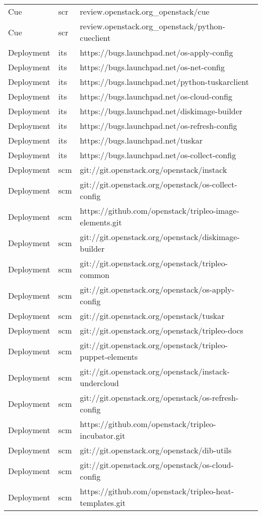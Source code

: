 \begin{center}
\begin{longtable}{|p{4cm}|p{1cm}|p{10cm}|}
Cue&scr&review.openstack.org\_openstack/cue\\ 
Cue&scr&review.openstack.org\_openstack/python-cueclient\\ 
Deployment&its&https://bugs.launchpad.net/os-apply-config\\ 
Deployment&its&https://bugs.launchpad.net/os-net-config\\ 
Deployment&its&https://bugs.launchpad.net/python-tuskarclient\\ 
Deployment&its&https://bugs.launchpad.net/os-cloud-config\\ 
Deployment&its&https://bugs.launchpad.net/diskimage-builder\\ 
Deployment&its&https://bugs.launchpad.net/os-refresh-config\\ 
Deployment&its&https://bugs.launchpad.net/tuskar\\ 
Deployment&its&https://bugs.launchpad.net/os-collect-config\\ 
Deployment&scm&git://git.openstack.org/openstack/instack\\ 
Deployment&scm&git://git.openstack.org/openstack/os-collect-config\\ 
Deployment&scm&https://github.com/openstack/tripleo-image-elements.git\\ 
Deployment&scm&git://git.openstack.org/openstack/diskimage-builder\\ 
Deployment&scm&git://git.openstack.org/openstack/tripleo-common\\ 
Deployment&scm&git://git.openstack.org/openstack/os-apply-config\\ 
Deployment&scm&git://git.openstack.org/openstack/tuskar\\ 
Deployment&scm&git://git.openstack.org/openstack/tripleo-docs\\ 
Deployment&scm&git://git.openstack.org/openstack/tripleo-puppet-elements\\ 
Deployment&scm&git://git.openstack.org/openstack/instack-undercloud\\ 
Deployment&scm&git://git.openstack.org/openstack/os-refresh-config\\ 
Deployment&scm&https://github.com/openstack/tripleo-incubator.git\\ 
Deployment&scm&git://git.openstack.org/openstack/dib-utils\\ 
Deployment&scm&git://git.openstack.org/openstack/os-cloud-config\\ 
Deployment&scm&https://github.com/openstack/tripleo-heat-templates.git\\ 

\end{longtable}
\end{center}
